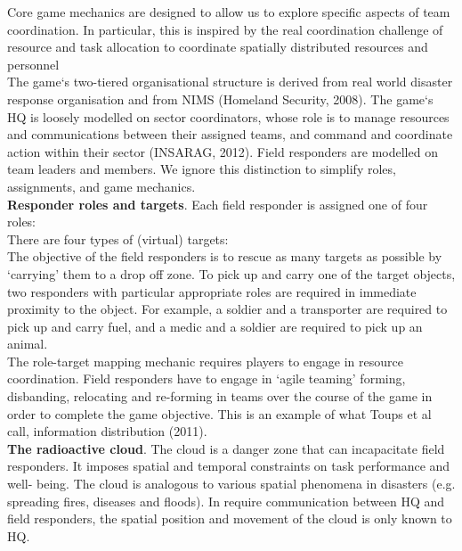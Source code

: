 Core game mechanics are designed to allow us to explore specific aspects of team coordination. In particular, this is inspired by the real coordination challenge of resource and task allocation to coordinate spatially distributed resources and personnel\\

The game`s two-tiered organisational structure is derived from real world disaster response organisation and from NIMS (Homeland Security, 2008). The game`s HQ is loosely modelled on sector coordinators, whose role is to manage resources and communications between their assigned teams, and command and coordinate action within their sector (INSARAG, 2012). Field responders are modelled on team leaders and members. We ignore this distinction to simplify roles, assignments, and game mechanics.\\

\textbf{Responder roles and targets}. Each field responder is assigned one of four roles:\\

There are four types of (virtual) targets:\\

The objective of the field responders is to rescue as many targets as possible by `carrying' them to a drop off zone. To pick up and carry one of the target objects, two responders with particular appropriate roles are required in immediate proximity to the object. For example, a soldier and a transporter are required to pick up and carry fuel, and a medic and a soldier are required to pick up an animal.\\

The role-target mapping mechanic requires players to engage in resource coordination. Field responders have to engage in `agile teaming' forming, disbanding, relocating and re-forming in teams over the course of the game in order to complete the game objective. This is an example of what Toups et al call, information distribution (2011).\\

\textbf{The radioactive cloud}. The cloud is a danger zone that can incapacitate field responders. It imposes spatial and temporal constraints on task performance and well- being. The cloud is analogous to various spatial phenomena in disasters (e.g. spreading fires, diseases and floods). In require communication between HQ and field responders, the spatial position and movement of the cloud is only known to HQ. \\

